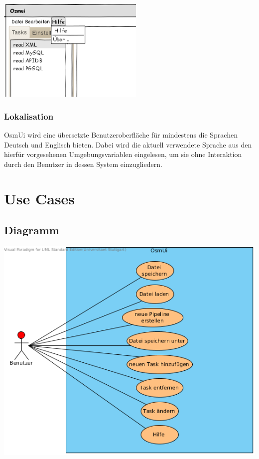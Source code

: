 \documentclass[a4paper,12pt]{scrartcl}
\begin{document}
\begin{itemize}
\\
\begin{center}
\includegraphics[width=7cm]{ui_prototype/OsmUi_Hilfeklein.png}
\end{center}
\end{itemize}

\subsubsection{Lokalisation}
OsmUi wird eine übersetzte Benutzeroberfläche für mindestens die Sprachen Deutsch und Englisch bieten. Dabei wird die aktuell verwendete
Sprache aus den hierfür vorgesehenen Umgebungsvariablen eingelesen, um sie ohne Interaktion durch den Benutzer in dessen System einzugliedern.
\newpage
\section{Use Cases}
\subsection{Diagramm}
\begin{center}
\includegraphics[width=15cm]{Use-Cases.png}
\end{center}
\end{document}
